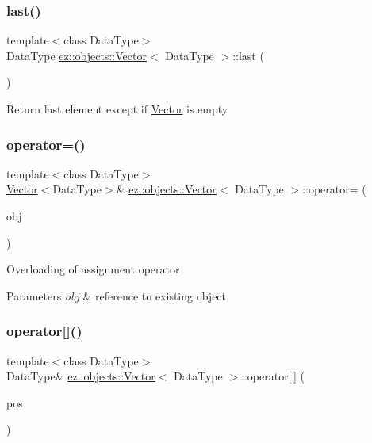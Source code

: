 \subsubsection{\texorpdfstring{last()}{last()}}
{\footnotesize\ttfamily template$<$class Data\+Type$>$ \\
Data\+Type \hyperlink{classez_1_1objects_1_1Vector}{ez\+::objects\+::\+Vector}$<$ Data\+Type $>$\+::last (\begin{DoxyParamCaption}{ }\end{DoxyParamCaption})\hspace{0.3cm}{\ttfamily [inline]}}

Return last element except if \hyperlink{classez_1_1objects_1_1Vector}{Vector} is empty \mbox{\label{classez_1_1objects_1_1Vector_a26bb7742a22ce16d505feb5084e3a31c}} 
\subsubsection{\texorpdfstring{operator=()}{operator=()}}
{\footnotesize\ttfamily template$<$class Data\+Type$>$ \\
\hyperlink{classez_1_1objects_1_1Vector}{Vector}$<$Data\+Type$>$\& \hyperlink{classez_1_1objects_1_1Vector}{ez\+::objects\+::\+Vector}$<$ Data\+Type $>$\+::operator= (\begin{DoxyParamCaption}\item[{const \hyperlink{classez_1_1objects_1_1Vector}{Vector}$<$ Data\+Type $>$ \&}]{obj }\end{DoxyParamCaption})\hspace{0.3cm}{\ttfamily [inline]}}

Overloading of assignment operator 
\begin{DoxyParams}{Parameters}
{\em obj} & reference to existing object \\
\hline
\end{DoxyParams}
\mbox{\label{classez_1_1objects_1_1Vector_aee5011651f4f13353fd0b8906467b6e3}} 
\subsubsection{\texorpdfstring{operator[]()}{operator[]()}}
{\footnotesize\ttfamily template$<$class Data\+Type$>$ \\
Data\+Type\& \hyperlink{classez_1_1objects_1_1Vector}{ez\+::objects\+::\+Vector}$<$ Data\+Type $>$\+::operator\mbox{[}$\,$\mbox{]} (\begin{DoxyParamCaption}\item[{integer}]{pos }\end{DoxyParamCaption})\hspace{0.3cm}{\ttfamily [inline]}}

